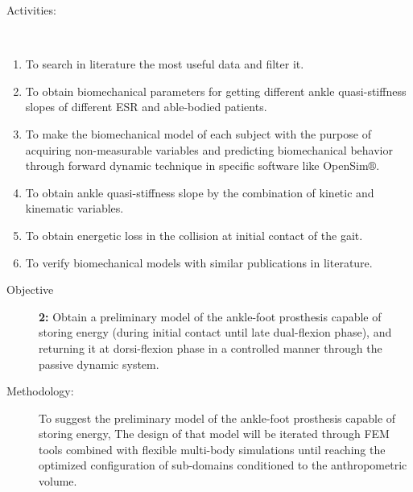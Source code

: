 \documentclass[12pt,english]{article}
\begin{document}
\begin{description}
\item [{Activities:}]~\end{description}
\begin{enumerate}
\item To search in literature the most useful data and filter it.
\item To obtain biomechanical parameters for getting different ankle quasi-stiffness slopes of different ESR and able-bodied patients. 
\item To make the biomechanical model of each subject with the purpose of acquiring non-measurable variables and predicting biomechanical behavior through forward dynamic technique in specific software like OpenSim$\circledR$.
\item To obtain ankle quasi-stiffness slope by the combination of kinetic and kinematic variables.
\item To obtain energetic loss in the collision at initial contact of the gait.
\item To verify biomechanical models with similar publications in literature. \end{enumerate}
\begin{description}
\item [{Objective}]  \textbf{ 2: } Obtain a preliminary model of the ankle-foot prosthesis capable of storing energy (during initial contact until late dual-flexion phase), and returning it at dorsi-flexion phase in a controlled manner through the passive dynamic system.
\item [{Methodology:}] To suggest the preliminary model of the ankle-foot prosthesis capable of storing energy, The design of that model will be iterated through FEM tools combined with flexible multi-body simulations until reaching the optimized configuration of sub-domains conditioned to the anthropometric volume. 

\end{description}
\end{document}
